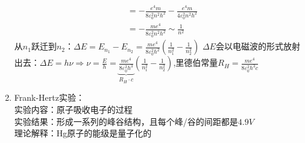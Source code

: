 \documentclass{article}
\renewcommand\var[1]{\Delta#1}
\begin{document}
\begin{enumerate}[label=(\arabic*)]
\[\begin{split}
					&= -\frac{e^4m}{8\varepsilon_0^2n^2h^2}-\frac{e^4m}{4\varepsilon_0^2n^2h^2}\\
					&= -\frac{me^4}{8\varepsilon_0^2n^2h^2}\sim \frac{1}{n^2}
				\end{split}\]
				从$n_1$跃迁到$n_2$：$\var{E} = E_{n_1}-E_{n_2} = \frac{me^4}{8\varepsilon_0^2h^2}\left(\frac{1}{n_1^2}-\frac{1}{n_2^2}\right)$
				$\var{E}$会以电磁波的形式放射出去：$\var{E}=h\nu \Rightarrow \nu = \frac{E}{h}=\underbrace{\frac{me^4}{8\varepsilon_0^2h^3}}_{R_H\cdot c}\left(\frac{1}{n_1^2}-\frac{1}{n_2^2}\right)$,里德伯常量$R_H=\frac{me^4}{8\varepsilon_0^2h^3c}$
	\item Frank-Hertz实验：\\
				实验内容：原子吸收电子的过程\\
				实验结果：形成一系列的峰谷结构，且每个峰/谷的间距都是$4.9\si{V}$\\
				理论解释：Hg原子的能级是量子化的
\end{enumerate}
\end{document}
